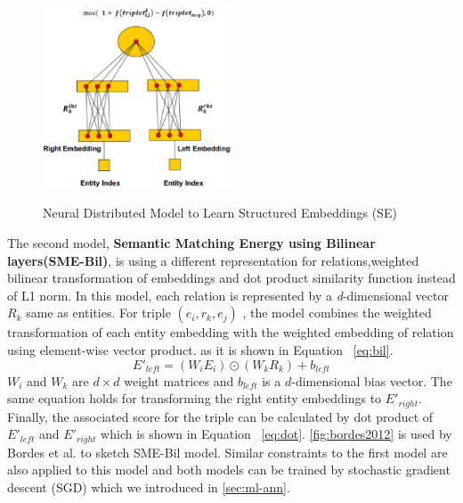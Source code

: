     \begin{figure}[h!]
  \caption{Neural Distributed Model to Learn Structured Embeddings (SE)}
  \centering
    \includegraphics[width=0.5\textwidth]{bordes2011.eps}
    \label{fig:bordes2011}
\end{figure} 
    The second model, \textbf{Semantic Matching Energy using Bilinear layers(SME-Bil)}, 
    is using a different representation for relations,weighted bilinear
    transformation of embeddings and  dot product similarity function instead of L1 norm. 
    In this model, each relation is represented by a \textit{d}-dimensional vector $R_{k}$ same as entities. 
    For triple $(e_{i},r_{k} , e_{j} )$ , the model combines the weighted transformation of each entity embedding with 
    the weighted embedding of relation using element-wise vector product. as it is shown in Equation ~\eqref{eq:bil}.
    \begin{equation}
    \label{eq:bil} E'_{left} = (W_{i} E_{i}) \odot (W_{k} R_{k}) + b_{left}
    \end{equation}
    $W_{i}$ and $W_{k}$ are $d \times d$ weight matrices and $b_{left}$ is a $d$-dimensional bias vector. 
    The same equation holds for transforming the right entity embeddings to $E'_{right}$. Finally, the associated score for the triple
     can be calculated by dot product of $E'_{left}$ and $E'_{right}$ which is
     shown in Equation ~\ref{eq:dot}. \autoref{fig:bordes2012} is used by Bordes
     et al. to sketch SME-Bil model. Similar constraints to the first model are also applied to this model and 
     both models can be trained by stochastic gradient descent (SGD) which we
     introduced in \autoref{sec:ml-ann}.
    
